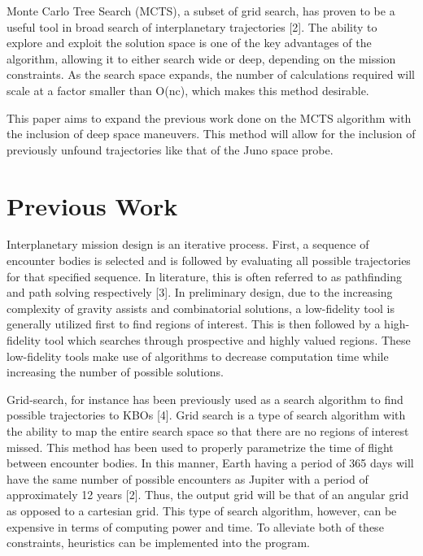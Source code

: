 \documentclass[letterpaper, preprint, paper,11pt]{AAS}	%
\begin{document}
Monte Carlo Tree Search (MCTS), a subset of grid search, has proven to be a useful tool in broad search of interplanetary trajectories [2]. The ability to explore and exploit the solution space is one of the key advantages of the algorithm, allowing it to either search wide or deep, depending on the mission constraints. As the search space expands, the number of calculations required will scale at a factor smaller than O(nc), which makes this method desirable.

This paper aims to expand the previous work done on the MCTS algorithm with the inclusion of deep space maneuvers. This method will allow for the inclusion of previously unfound trajectories like that of the Juno space probe. 

\section{Previous Work}

Interplanetary mission design is an iterative process. First, a sequence of encounter bodies is selected and is followed by evaluating all possible trajectories for that specified sequence. In literature, this is often referred to as pathfinding and path solving respectively [3]. In preliminary design, due to the increasing complexity of gravity assists and combinatorial solutions, a low-fidelity tool is generally utilized first to find regions of interest. This is then followed by a high-fidelity tool which searches through prospective and highly valued regions. These low-fidelity tools make use of algorithms to decrease computation time while increasing the number of possible solutions. 

Grid-search, for instance has been previously used as a search algorithm to find possible trajectories to KBOs [4]. Grid search is a type of search algorithm with the ability to map the entire search space so that there are no regions of interest missed. This method has been used to properly parametrize the time of flight between encounter bodies. In this manner, Earth having a period of 365 days will have the same number of possible encounters as Jupiter with a period of approximately 12 years [2]. Thus, the output grid will be that of an angular grid as opposed to a cartesian grid. This type of search algorithm, however, can be expensive in terms of computing power and time. To alleviate both of these constraints, heuristics can be implemented into the program. 
\end{document}
